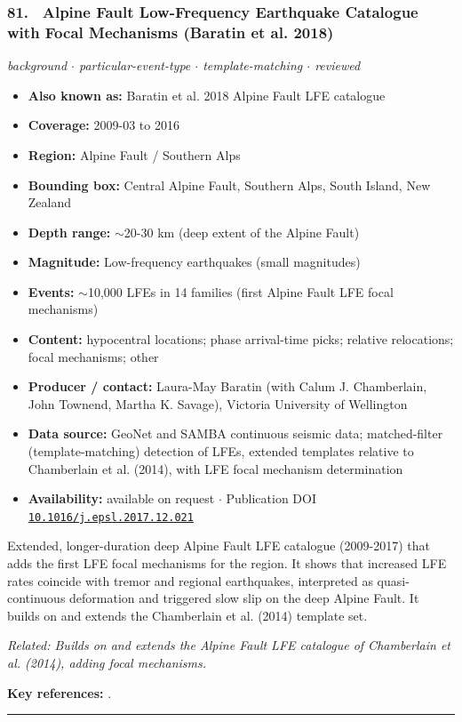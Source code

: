 \documentclass[10pt,a4paper]{article}
\newcommand{\catentryrule}{\par\vspace{3pt}\noindent\textcolor{rulegrey}{\rule{\linewidth}{0.3pt}}\par\vspace{5pt}}
\newcommand{\kv}[2]{\item \textbf{#1:} #2}
\begin{document}
\subsubsection*{\hypertarget{c:81}{81.}~ Alpine Fault Low-Frequency Earthquake Catalogue with Focal Mechanisms (Baratin et al. 2018)}
{\small\itshape background $\cdot$ particular-event-type $\cdot$ template-matching $\cdot$ reviewed}\par\vspace{2pt}
\begin{itemize}[leftmargin=1.3em,itemsep=0.6pt,topsep=1pt,parsep=0pt]
\kv{Also known as}{Baratin et al. 2018 Alpine Fault LFE catalogue}
\kv{Coverage}{2009-03 to 2016}
\kv{Region}{Alpine Fault / Southern Alps}
\kv{Bounding box}{Central Alpine Fault, Southern Alps, South Island, New Zealand}
\kv{Depth range}{$\sim$20-30 km (deep extent of the Alpine Fault)}
\kv{Magnitude}{Low-frequency earthquakes (small magnitudes)}
\kv{Events}{$\sim$10,000 LFEs in 14 families (first Alpine Fault LFE focal mechanisms)}
\kv{Content}{hypocentral locations; phase arrival-time picks; relative relocations; focal mechanisms; other}
\kv{Producer / contact}{Laura-May Baratin (with Calum J. Chamberlain, John Townend, Martha K. Savage), Victoria University of Wellington}
\kv{Data source}{GeoNet and SAMBA continuous seismic data; matched-filter (template-matching) detection of LFEs, extended templates relative to Chamberlain et al. (2014), with LFE focal mechanism determination}
\kv{Availability}{available on request $\cdot$ Publication DOI \href{https://doi.org/10.1016/j.epsl.2017.12.021}{\nolinkurl{10.1016/j.epsl.2017.12.021}}}
\end{itemize}
\par\vspace{2pt}Extended, longer-duration deep Alpine Fault LFE catalogue (2009-2017) that adds the first LFE focal mechanisms for the region. It shows that increased LFE rates coincide with tremor and regional earthquakes, interpreted as quasi-continuous deformation and triggered slow slip on the deep Alpine Fault. It builds on and extends the Chamberlain et al. (2014) template set.
\par{\small\itshape Related: Builds on and extends the Alpine Fault LFE catalogue of Chamberlain et al. (2014), adding focal mechanisms.}
\par\vspace{2pt}\textbf{Key references:} \cite{Baratin2018}.
\catentryrule
\end{document}
